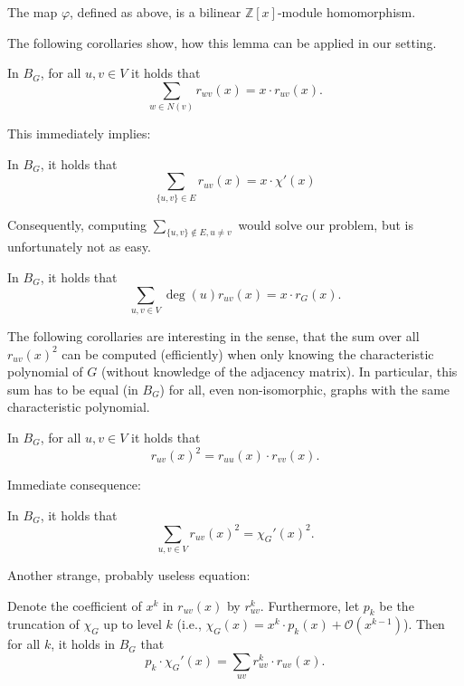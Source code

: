 \documentclass[a4paper,12pt]{article}
\begin{document}
\begin{lemma}
The map $\varphi$, defined as above, is a bilinear $\mathbb{Z}[x]$-module homomorphism.
\end{lemma}

The following corollaries show, how this lemma can be applied in our setting.

\begin{cor}
In $B_G$, for all $u,v\in V$ it holds that
$$
\sum_{w\in N(v)}r_{wv}(x) = x \cdot r_{uv}(x).
$$
\end{cor}
This immediately implies:
\begin{cor}
In $B_G$, it holds that
$$
\sum_{\{u,v\}\in E}r_{uv}(x) = x\cdot\chi'(x)
$$
\end{cor}

Consequently, computing $\sum_{\{u,v\}\notin E, u \neq v}$ would solve our problem, but is unfortunately not as easy.

\begin{cor}
In $B_G$, it holds that
$$
\sum_{u,v \in V} \deg(u)r_{uv}(x) = x \cdot r_G(x).
$$
\end{cor}

The following corollaries are interesting in the sense, that the sum over all $r_{uv}(x)^2$ can be computed (efficiently) when only knowing the characteristic polynomial of $G$ (without knowledge of the adjacency matrix). In particular, this sum has to be equal (in $B_G$) for all, even non-isomorphic, graphs with the same characteristic polynomial.

\begin{cor}
In $B_G$, for all $u,v \in V$ it holds that
$$
r_{uv}(x)^2 = r_{uu}(x) \cdot r_{vv}(x).
$$
\end{cor}

Immediate consequence:

\begin{cor}
In $B_G$, it holds that
$$
\sum_{u,v\in V}r_{uv}(x)^2 = \chi_G'(x)^2.
$$
\end{cor}

Another strange, probably useless equation:

\begin{cor}
Denote the coefficient of $x^k$ in $r_{uv}(x)$ by $r_{uv}^k$. Furthermore, let $p_k$ be the truncation of $\chi_G$ up to level $k$ (i.e., $\chi_G(x) = x^k \cdot p_k(x) + \mathcal{O}(x^{k-1})$). Then for all $k$, it holds in $B_G$ that
$$
p_k \cdot \chi_G'(x) = \sum_{uv}r_{uv}^k \cdot r_{uv}(x).
$$
\end{cor}
\end{document}
